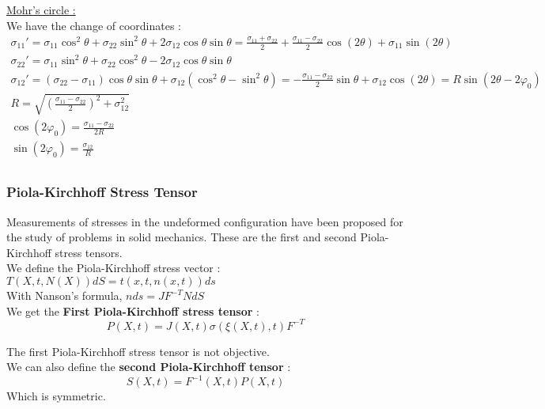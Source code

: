 \documentclass[../main.tex]{subfiles}
\begin{document}
\quad \underline{Mohr's circle :}\\
We have the change of coordinates : \begin{equation}
    \begin{gathered}
        \sigma_{11}' = \sigma_{11} \cos^2 \theta + \sigma_{22} \sin^2 \theta + 2\sigma_{12} \cos \theta \sin \theta = \frac{\sigma_{11}+\sigma_{22}}{2} + \frac{\sigma_{11}-\sigma_{22}}{2}\cos(2\theta) + \sigma_{11}\sin(2\theta)\\
        \sigma_{22}' = \sigma_{11} \sin^2 \theta + \sigma_{22} \cos^2 \theta - 2\sigma_{12} \cos \theta \sin \theta\\
        \sigma_{12}' = (\sigma_{22}-\sigma_{11}) \cos \theta \sin \theta + \sigma_{12}(\cos^2 \theta - \sin^2 \theta) = -\frac{\sigma_{11}-\sigma_{22}}{2}\sin \theta + \sigma_{12} \cos(2\theta) = R\sin(2\theta - 2\varphi_0)\\
        R = \sqrt{(\frac{\sigma_{11}-\sigma_{22}}{2})^2 + \sigma_{12}^2}\\
        \cos(2\varphi_0) = \frac{\sigma_{11}-\sigma_{22}}{2R}\\
        \sin(2\varphi_0) = \frac{\sigma_{12}}{R}\\
    \end{gathered}
\end{equation}

\subsubsection{Piola-Kirchhoff Stress Tensor}
Measurements of stresses in the undeformed configuration have been proposed for the study of problems in solid mechanics. These are the first and second Piola-Kirchhoff stress tensors.\\

We define the Piola-Kirchhoff stress vector : $T(X,t,N(X))dS = t(x,t,n(x,t))ds$\\
With Nanson's formula, $nds = JF^{-T} NdS$\\

We get the \textbf{First Piola-Kirchhoff stress tensor} : \begin{equation}
    P(X,t) = J(X,t) \sigma(\xi(X,t), t)F^{-T}
\end{equation}

\warning The first Piola-Kirchhoff stress tensor is not objective.\\

We can also define the \textbf{second Piola-Kirchhoff tensor} : \begin{equation}
    S(X,t) = F^{-1}(X,t) P(X,t)
\end{equation}
Which is symmetric.\\
\end{document}
